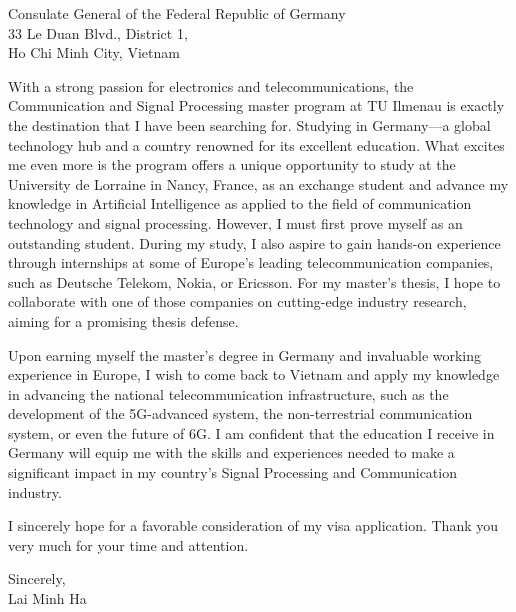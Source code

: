 \documentclass[a4paper,11pt]{letter}
\begin{document}
\begin{letter}{
    Consulate General of the Federal Republic of Germany
    \\ 33 Le Duan Blvd., District 1,
    \\ Ho Chi Minh City, Vietnam
}

With a strong passion for electronics and telecommunications, the Communication and Signal Processing master program at TU Ilmenau is exactly the destination that I have been searching for. Studying in Germany—a global technology hub and a country renowned for its excellent education. What excites me even more is the program offers a unique opportunity to study at the University de Lorraine in Nancy, France, as an exchange student and advance my knowledge in Artificial Intelligence as applied to the field of communication technology and signal processing. However, I must first prove myself as an outstanding student. During my study, I also aspire to gain hands-on experience through internships at some of Europe's leading telecommunication companies, such as Deutsche Telekom, Nokia, or Ericsson. For my master's thesis, I hope to collaborate with one of those companies on cutting-edge industry research, aiming for a promising thesis defense.

Upon earning myself the master's degree in Germany and invaluable working experience in Europe, I wish to come back to Vietnam and apply my knowledge in advancing the national telecommunication infrastructure, such as the development of the 5G-advanced system, the non-terrestrial communication system, or even the future of 6G. I am confident that the education I receive in Germany will equip me with the skills and experiences needed to make a significant impact in my country's Signal Processing and Communication industry.

I sincerely hope for a favorable consideration of my visa application. Thank you very much for your time and attention.

\begin{flushright}
    Sincerely,
    \\ Lai Minh Ha
\end{flushright}

\end{letter}
\end{document}
